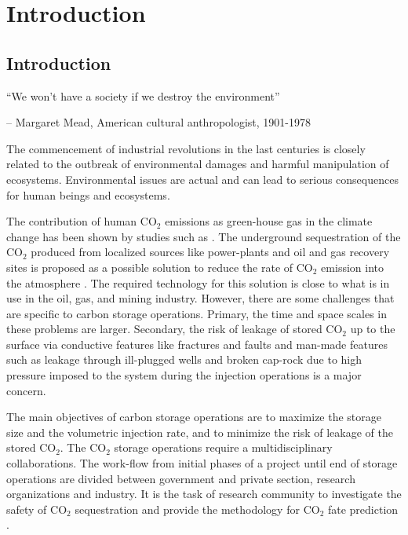 \chapter{Introduction}
%
\pagebreak

\section{Introduction}
\label{sec:Introduction}
``We won’t have a society if we destroy the environment''

\small{-- Margaret Mead,  American cultural anthropologist, 1901-1978}
\vspace{2.5cm} 

The commencement of industrial revolutions in the last centuries is closely
related to the outbreak of environmental damages and harmful manipulation of
ecosystems. Environmental issues are actual and can lead to serious consequences
for human beings and ecosystems.
 
The contribution of human $\mbox{CO}_2$ emissions as green-house gas in the
climate change has been shown by studies such as \cite{houghton2001climate}. The
underground sequestration of the $\mbox{CO}_2$ produced from localized sources
like power-plants and oil and gas recovery sites is proposed as a possible
solution to reduce the rate of $\mbox{CO}_2$ emission into the atmosphere
\cite{hitchon1999sedimentary,bradshaw2001geological}. The required technology
for this solution is close to what is in use in the oil, gas, and mining
industry. However, there are some challenges that are specific to carbon storage
operations. Primary, the time and space scales in these problems are larger.
Secondary, the risk of leakage of stored $\mbox{CO}_2$ up to the surface via
conductive features like fractures and faults and man-made features such as
leakage through ill-plugged wells and broken cap-rock due to high pressure
imposed to the system during the injection operations is a major concern. 

The main objectives of carbon storage operations are to maximize the storage
size and the volumetric injection rate, and to minimize the risk of leakage of
the stored $\mbox{CO}_2$. The $\mbox{CO}_2$ storage operations require a
multidisciplinary collaborations. The work-flow from initial phases of a project
until end of storage operations are divided between government and private
section, research organizations and industry. It is the task of research
community to investigate the safety of $\mbox{CO}_2$ sequestration and provide
the methodology for $\mbox{CO}_2$ fate prediction \cite{bachu2000sequestration}.

